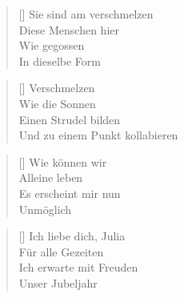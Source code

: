\documentclass[twocolumn]{article}
\newenvironment{Strophe}{\begin{minipage}{\versewidth} \begin{verse}[\versewidth]}{\end{verse} \end{minipage}\vspace{0.05cm}}
\begin{document}
	\begin{Strophe}	
		Sie sind am verschmelzen \\
		Diese Menschen hier \\
		Wie gegossen \\
		In dieselbe Form \\
	\end{Strophe}
	
	\begin{Strophe}
		Verschmelzen \\
		Wie die Sonnen \\
		Einen Strudel bilden \\
		Und zu einem Punkt kollabieren \\
	\end{Strophe}
	
	\begin{Strophe}
		Wie können wir \\
		Alleine leben \\
		Es erscheint mir nun \\
		Unmöglich \\
	\end{Strophe}
	
	\begin{Strophe}
		Ich liebe dich, Julia \\
		Für alle Gezeiten \\
		Ich erwarte mit Freuden \\
		Unser Jubeljahr \\
	\end{Strophe}
\end{document}
